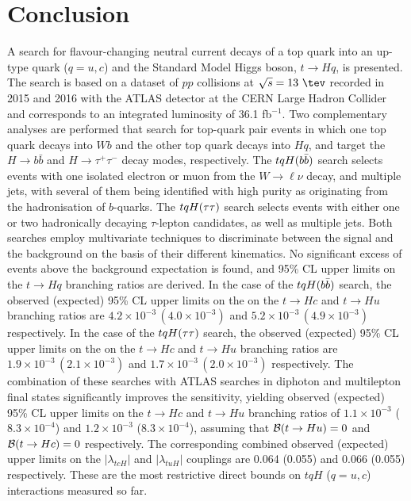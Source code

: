 \section{Conclusion}
\label{sec:conclusion}

A search for flavour-changing neutral current decays of a top quark into an up-type quark ($q=u, c$) and the Standard Model Higgs boson, $t\to Hq$, is presented. 
The search is based on a dataset of $pp$ collisions at $\sqrt{s}=13~\tev$ recorded in 2015 and 2016 with the ATLAS detector at the 
CERN Large Hadron Collider and corresponds to an integrated luminosity of 36.1 fb$^{-1}$.
Two complementary analyses are performed that search for top-quark pair events in which one top quark decays into $Wb$ and the other top quark decays into $Hq$,
and target the $H \to b\bar{b}$ and $H \to \tau^+\tau^-$  decay modes, respectively.  
The $tqH(b\bar{b})$ search selects events with one isolated electron or muon from the $W \to \ell\nu$ decay, and multiple jets, with several 
of them being identified with high purity as originating from the hadronisation of $b$-quarks. 
The $tqH(\tau\tau)$ search selects events with either one or two hadronically decaying $\tau$-lepton candidates, as well as multiple jets. 
Both searches employ multivariate techniques to discriminate between the signal and the background on the basis of their different kinematics. 
No significant excess of events above the background expectation is found, and 95\% CL upper limits on the $t\to Hq$ branching ratios are derived.
In the case of the $tqH(b\bar{b})$ search, the observed (expected) 95\% CL upper limits on the on the $t\to Hc$ and $t\to Hu$ branching ratios 
are $4.2 \times 10^{-3}\,(4.0 \times 10^{-3})$ and $5.2 \times 10^{-3}\,(4.9 \times 10^{-3})$ respectively.
In the case of the $tqH(\tau\tau)$ search, the observed (expected) 95\% CL upper limits on the on the $t\to Hc$ and $t\to Hu$ branching ratios 
are $1.9 \times 10^{-3}\,(2.1 \times 10^{-3})$ and $1.7 \times 10^{-3}\,(2.0 \times 10^{-3})$ respectively.
The combination of these searches with ATLAS searches in diphoton and multilepton final states significantly improves the sensitivity, 
yielding observed (expected) 95\% CL upper limits on the $t\to Hc$ and $t\to Hu$ branching ratios of $1.1 \times 10^{-3}$ ($8.3 \times 10^{-4}$) 
and $1.2 \times 10^{-3}$ ($8.3 \times 10^{-4}$), assuming that $\mathcal{B}(t\to Hu)=0$ and $\mathcal{B}(t\to Hc)=0$ respectively.
The corresponding combined observed (expected) upper limits on the $|\lambda_{tcH}|$ and $|\lambda_{tuH}|$ couplings are 0.064 (0.055) and 0.066 (0.055) respectively. 
These are the most restrictive direct bounds on $tqH$ ($q=u,c$) interactions measured so far.

